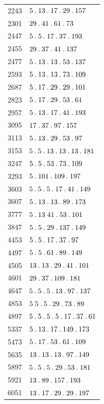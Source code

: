 \begin{longtable}{@{}r|l@{}}
2243 & $5\pdot 13\pdot 17\pdot 29\pdot 157$\\
2301 & $29\pdot 41\pdot 61\pdot 73$\\
2447 & $5\pdot 5\pdot 17\pdot 37\pdot 193$\\
2455 & $29\pdot 37\pdot 41\pdot 137$\\
2477 & $5\pdot 13\pdot 13\pdot 53\pdot 137$\\
2593 & $5\pdot 13\pdot 13\pdot 73\pdot 109$\\
2687 & $5\pdot 17\pdot 29\pdot 29\pdot 101$\\
2823 & $5\pdot 17\pdot 29\pdot 53\pdot 61$\\
2957 & $5\pdot 13\pdot 17\pdot 41\pdot 193$\\
3095 & $17\pdot 37\pdot 97\pdot 157$\\
3113 & $5\pdot 13\pdot 29\pdot 53\pdot 97$\\
3153 & $5\pdot 5\pdot 13\pdot 13\pdot 13\pdot 181$\\
3247 & $5\pdot 5\pdot 53\pdot 73\pdot 109$\\
3293 & $5\pdot 101\pdot 109\pdot 197$\\
3603 & $5\pdot 5\pdot 5\pdot 17\pdot 41\pdot 149$\\
3607 & $5\pdot 13\pdot 13\pdot 89\pdot 173$\\
3777 & $5\pdot 13\;41\pdot 53\pdot 101$\\
3847 & $5\pdot 5\pdot 29\pdot 137\pdot 149$\\
4453 & $5\pdot 5\pdot 17\pdot 37\pdot 97$\\
4497 & $5\pdot 5\pdot 61\pdot 89\pdot 149$\\
4505 & $13\pdot 13\pdot 29\pdot 41\pdot 101$\\
4601 & $29\pdot 37\pdot 109\pdot 181$\\
4647 & $5\pdot 5\pdot 5\pdot 13\pdot 97\pdot 137$\\
4853 & $5\;5\pdot 5\pdot 29\pdot 73\pdot 89$\\
4897 & $5\pdot 5\pdot 5\pdot 5\pdot 17\pdot 37\pdot 61$\\
5337 & $5\pdot 13\pdot 17\pdot 149\pdot 173$\\
5473 & $5\pdot 17\pdot 53\pdot 61\pdot 109$\\
5635 & $13\pdot 13\pdot 13\pdot 97\pdot 149$\\
5897 & $5\pdot 5\pdot 5\pdot 29\pdot 53\pdot 181$\\
5921 & $13\pdot 89\pdot 157\pdot 193$\\
6051 & $13\pdot 17\pdot 29\pdot 29\pdot 197$\\

\end{longtable}
